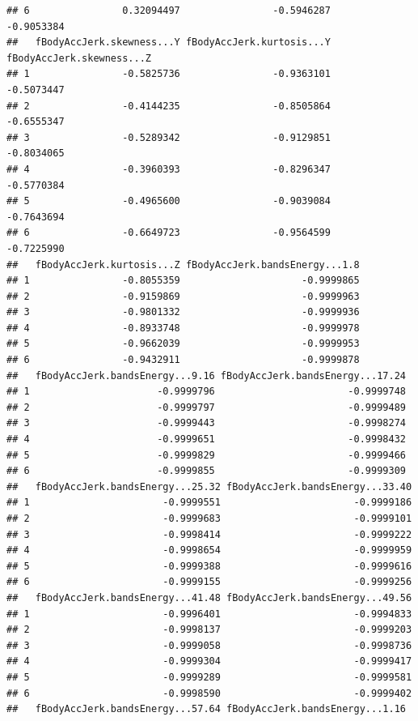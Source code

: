 \documentclass[
]{article}
\begin{document}
\begin{verbatim}
## 6                0.32094497                -0.5946287                -0.9053384
##   fBodyAccJerk.skewness...Y fBodyAccJerk.kurtosis...Y fBodyAccJerk.skewness...Z
## 1                -0.5825736                -0.9363101                -0.5073447
## 2                -0.4144235                -0.8505864                -0.6555347
## 3                -0.5289342                -0.9129851                -0.8034065
## 4                -0.3960393                -0.8296347                -0.5770384
## 5                -0.4965600                -0.9039084                -0.7643694
## 6                -0.6649723                -0.9564599                -0.7225990
##   fBodyAccJerk.kurtosis...Z fBodyAccJerk.bandsEnergy...1.8
## 1                -0.8055359                     -0.9999865
## 2                -0.9159869                     -0.9999963
## 3                -0.9801332                     -0.9999936
## 4                -0.8933748                     -0.9999978
## 5                -0.9662039                     -0.9999953
## 6                -0.9432911                     -0.9999878
##   fBodyAccJerk.bandsEnergy...9.16 fBodyAccJerk.bandsEnergy...17.24
## 1                      -0.9999796                       -0.9999748
## 2                      -0.9999797                       -0.9999489
## 3                      -0.9999443                       -0.9998274
## 4                      -0.9999651                       -0.9998432
## 5                      -0.9999829                       -0.9999466
## 6                      -0.9999855                       -0.9999309
##   fBodyAccJerk.bandsEnergy...25.32 fBodyAccJerk.bandsEnergy...33.40
## 1                       -0.9999551                       -0.9999186
## 2                       -0.9999683                       -0.9999101
## 3                       -0.9998414                       -0.9999222
## 4                       -0.9998654                       -0.9999959
## 5                       -0.9999388                       -0.9999616
## 6                       -0.9999155                       -0.9999256
##   fBodyAccJerk.bandsEnergy...41.48 fBodyAccJerk.bandsEnergy...49.56
## 1                       -0.9996401                       -0.9994833
## 2                       -0.9998137                       -0.9999203
## 3                       -0.9999058                       -0.9998736
## 4                       -0.9999304                       -0.9999417
## 5                       -0.9999289                       -0.9999581
## 6                       -0.9998590                       -0.9999402
##   fBodyAccJerk.bandsEnergy...57.64 fBodyAccJerk.bandsEnergy...1.16

\end{verbatim}
\end{document}
